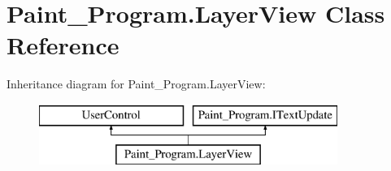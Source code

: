 \hypertarget{class_paint___program_1_1_layer_view}{}\section{Paint\+\_\+\+Program.\+Layer\+View Class Reference}
\label{class_paint___program_1_1_layer_view}
Inheritance diagram for Paint\+\_\+\+Program.\+Layer\+View\+:\begin{figure}[H]
\begin{center}
\leavevmode
\includegraphics[height=2.000000cm]{class_paint___program_1_1_layer_view}
\end{center}
\end{figure}
